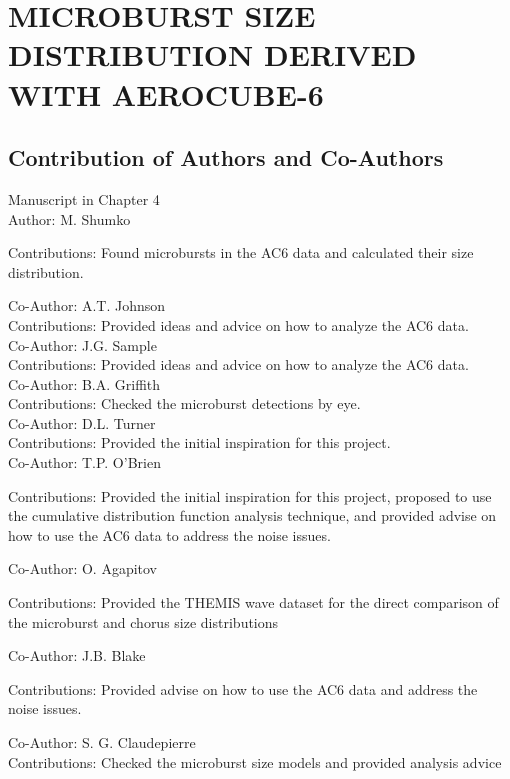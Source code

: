 
\chapter[MICROBURST SIZE DISTRIBUTION DERIVED WITH \\ AEROCUBE-6]{MICROBURST SIZE DISTRIBUTION DERIVED WITH AEROCUBE-6} \label{CH:ac6_study}

\section{Contribution of Authors and \noindent \noindent Co-Authors} 
\noindent Manuscript in Chapter 4 \\ 

\noindent Author: M. Shumko
\begin{singlespace} \noindent Contributions: Found microbursts in the AC6 data and calculated their size distribution. \end{singlespace}
\noindent \noindent Co-Author: A.T. Johnson \\
\noindent Contributions: Provided ideas and advice on how to analyze the AC6 data. \\
\noindent \noindent Co-Author: J.G. Sample \\
\noindent Contributions: Provided ideas and advice on how to analyze the AC6 data. \\
\noindent \noindent Co-Author: B.A. Griffith \\
\noindent Contributions: Checked the microburst detections by eye. \\
\noindent Co-Author: D.L. Turner \\
\noindent Contributions: Provided the initial inspiration for this project. \\
\noindent Co-Author: T.P. O’Brien
\begin{singlespace} \noindent Contributions: Provided the initial inspiration for this project, proposed to use the cumulative distribution function analysis technique, and provided advise on how to use the AC6 data to address the noise issues.  \end{singlespace}
\noindent Co-Author: O. Agapitov
\begin{singlespace} \noindent Contributions: Provided the THEMIS wave dataset for the direct comparison of the microburst and chorus size distributions \end{singlespace}
\noindent Co-Author: J.B. Blake
\begin{singlespace} \noindent Contributions: Provided advise on how to use the AC6 data and address the noise issues. \end{singlespace}
\noindent Co-Author: S. G. Claudepierre \\
\noindent Contributions: Checked the microburst size models and provided analysis advice
\newpage

